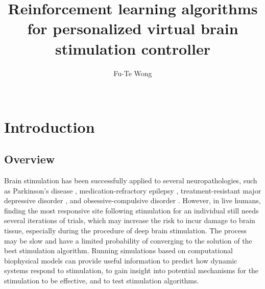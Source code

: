 \documentclass[12pt, a4paper]{article}
\title{Reinforcement learning algorithms for personalized virtual brain stimulation controller} %
\author{
Fu-Te Wong\\ %
\hfill\\
  }
\date{} %
\begin{document}
%

\maketitle %

\newpage
\setcounter{page}{1} %

\section*{Introduction} %
\subsection*{Overview}
Brain stimulation has been successfully applied to several neuropathologies, such as Parkinson’s disease \parencite{timmermannMultiplesourceCurrentSteering2015,vitekSubthalamicNucleusDeep2020}, medication-refractory epilepsy \parencite{salanovaLongtermEfficacySafety2015}, treatment-resistant major depressive disorder \parencite{scangosClosedloopNeuromodulationIndividual2021}, and obsessive-compulsive disorder \parencite{andersonTreatmentPatientsIntractable2003,franziniDeepbrainStimulationNucleus2010}.
However, in live humans, finding the most responsive site following stimulation for an individual still needs several iterations of trials, which may increase the risk to incur damage to brain tissue, especially during the procedure of deep brain stimulation. The process may be slow and have a limited probability of converging to the solution of the best stimulation algorithm. Running simulations based on computational biophysical models can provide useful information to predict how dynamic systems respond to stimulation, to gain insight into potential mechanisms for the stimulation to be effective, and to test stimulation algorithms.
\end{document}
